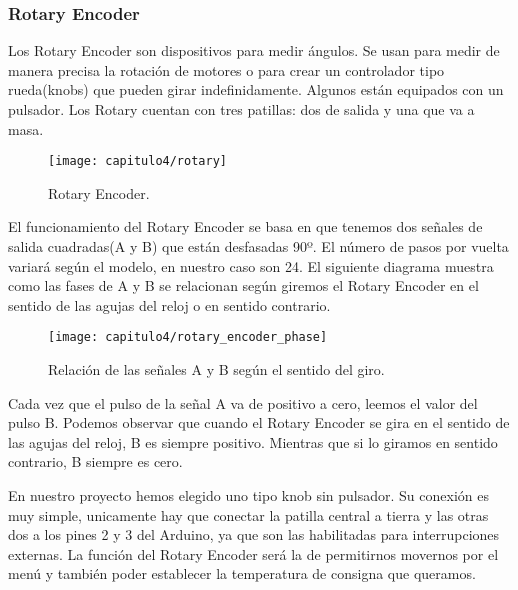 \subsubsection{Rotary Encoder}
Los Rotary Encoder son dispositivos para medir ángulos. Se usan para medir de manera precisa la rotación de motores o para crear un controlador tipo rueda(knobs) que pueden girar indefinidamente. Algunos están equipados con un pulsador. Los Rotary cuentan con tres patillas: dos de salida y una que va a masa.


\hfill
\begin{figure}[H]%
\noindent \begin{centering}
\texttt{[image: capitulo4/rotary]}
\par\end{centering}
\caption{\label{fig:rotary} Rotary Encoder.}
\end{figure}
\smallskip
	

El funcionamiento del Rotary Encoder se basa en que tenemos dos señales de salida cuadradas(A y B) que están desfasadas 90º. El número de pasos por vuelta variará según el modelo, en nuestro caso son 24. El siguiente diagrama muestra como las fases de A y B se relacionan según giremos el Rotary Encoder en el sentido de las agujas del reloj o en sentido contrario.

\smallskip
\begin{figure}[H]%
\noindent \begin{centering}
\texttt{[image: capitulo4/rotary\_encoder\_phase]}
\par\end{centering}
\caption{\label{fig:rotary_encoder_phase} Relación de las señales A y B según el sentido del giro.}
\end{figure}
\smallskip

Cada vez que el pulso de la señal A va de positivo a cero, leemos el valor del pulso B. Podemos observar que cuando el Rotary Encoder se gira en el sentido de las agujas del reloj, B es siempre positivo. Mientras que si lo giramos en sentido contrario, B siempre es cero.

En nuestro proyecto hemos elegido uno tipo knob sin pulsador. Su conexión es muy simple, unicamente hay que conectar la patilla central a tierra y las otras dos a los pines 2 y 3 del Arduino, ya que son las habilitadas para interrupciones externas. 
La función del Rotary Encoder será la de permitirnos movernos por el menú y también poder establecer la temperatura de consigna que queramos.


